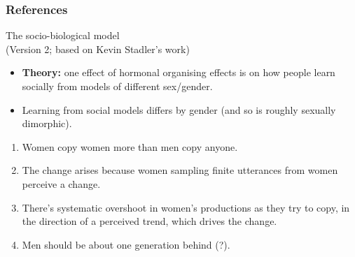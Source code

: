\documentclass[hyperref={pdfpagelabels=false}]{beamer}
\begin{document}
\begin{frame}[allowframebreaks]
\frametitle{References}
\newcommand*{\newblock}{natbib}


\end{frame}

\begin{frame}{The socio-biological model \\\small{(Version 2; based on Kevin Stadler's work)}}
	\begin{itemize}
	\item \textbf{Theory:} one effect of hormonal organising effects is on how people learn socially from models of different sex/gender.
	\item Learning from social models differs by gender (and so is roughly sexually dimorphic).
	\end{itemize}
	\begin{enumerate}
	\item Women copy women more than men copy anyone.
	\item The change arises because women sampling finite utterances from women perceive a change.
	\item There's systematic overshoot in women's productions as they try to copy, in the direction of a perceived trend, which drives the change.
	\item Men should be about one generation behind (?).
	\end{enumerate}

\end{frame}
\end{document}
